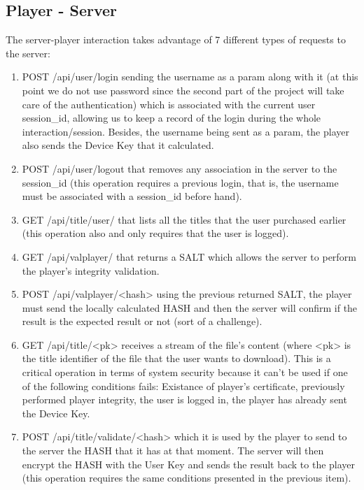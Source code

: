 \documentclass[11pt,a4paper]{report}
\begin{document}
\subsection{Player - Server}
The server-player interaction takes advantage of 7 different types of requests to the server:
\begin{enumerate}
\item POST  /api/user/login sending the username as a param along with it (at this point we do not use password since the second part of the project will take care of the authentication) which is associated with the current user session\_id, allowing us to keep a record of the login during the whole interaction/session. Besides, the username being sent as a param, the player also sends the Device Key that it calculated.
\item POST  /api/user/logout that removes any association in the server to the session\_id (this operation requires a previous login, that is, the username must be associated with a session\_id before hand).
\item GET   /api/title/user/ that lists all the titles that the user purchased earlier (this operation also and only requires that the user is logged).
\item GET   /api/valplayer/ that returns a SALT which allows the server to perform the player's integrity validation.
\item POST  /api/valplayer/<hash> using the previous returned SALT, the player must send the locally calculated HASH and then the server will confirm if the result is the expected result or not (sort of a challenge).
\item GET   /api/title/<pk> receives a stream of the file's content (where <pk> is the title identifier of the file that the user wants to download). This is a critical operation in terms of system security because it can't be used if one of the following conditions fails: Existance of player's certificate, previously performed player integrity, the user is logged in, the player has already sent the Device Key.
\item POST  /api/title/validate/<hash> which it is used by the player to send to the server the HASH that it has at that moment. The server will then encrypt the HASH with the User Key and sends the result back to the player (this operation requires the same conditions presented in the previous item).
\end{enumerate}
\end{document}
